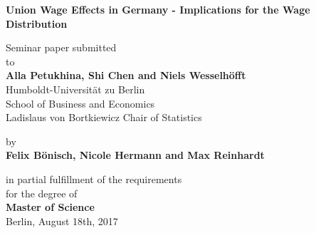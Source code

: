 \documentclass[a4paper,11pt]{article}
\begin{document}
\lstset{language=R}

\thispagestyle{empty}
\begin{center}
    {\LARGE{\bf Union Wage Effects in Germany - Implications for the Wage Distribution}} \vspace{1cm}


    {\large Seminar paper submitted\\\vspace{0.8cm}
    to}\\\vspace{0.5cm}
    {\large{\bf Alla Petukhina, Shi Chen and Niels Wesselh\"offt}} \\\vspace{0.8cm}
    {\large Humboldt-Universit\"at zu Berlin \\
    School of Business and Economics \\
    Ladislaus von Bortkiewicz Chair of Statistics} \vspace{1cm}


    {\large by \\\vspace{0.5cm}
    {\bf Felix B\"onisch, Nicole Hermann and Max Reinhardt}} \vspace{1cm}


    {\large in partial fulfillment of the requirements \\
    for the degree of \\
    {\bf Master of Science} \\\vspace{0.8cm}
    Berlin, August 18th, 2017}

\end{center}

\newpage
\tableofcontents
\clearpage


\newpage
{}



\newpage
{}
\ohead[]{\rightmark}
\listoffigures
\end{document}
